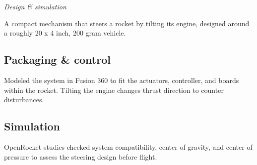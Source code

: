 \textit{Design \& simulation}
\par\medskip A compact mechanism that steers a rocket by tilting its engine, designed around a roughly 20 x 4 inch, 200 gram vehicle.
\par{}
\medskip
\subsection*{Packaging \& control}
Modeled the system in Fusion 360 to fit the actuators, controller, and boards within the rocket. Tilting the engine changes thrust direction to counter disturbances.
\subsection*{Simulation}
OpenRocket studies checked system compatibility, center of gravity, and center of pressure to assess the steering design before flight.